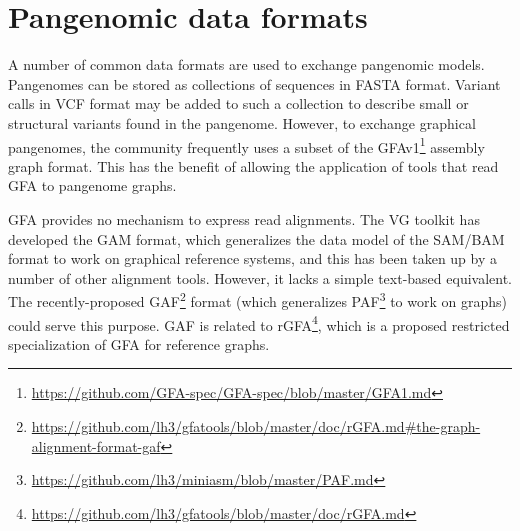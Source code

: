 \section{Pangenomic data formats}
\label{sec:formats}

A number of common data formats are used to exchange pangenomic models.
Pangenomes can be stored as collections of sequences in FASTA format.
Variant calls in VCF format \cite{danecek2011variant} may be added to such a collection to describe small or structural variants found in the pangenome.
However, to exchange graphical pangenomes, the community frequently uses a subset of the GFAv1\footnote{\url{https://github.com/GFA-spec/GFA-spec/blob/master/GFA1.md}} assembly graph format.
This has the benefit of allowing the application of tools that read GFA to pangenome graphs.

GFA provides no mechanism to express read alignments.
The \textsc{VG} toolkit has developed the GAM format, which generalizes the data model of the SAM/BAM \cite{Li_2009} format to work on graphical reference systems, and this has been taken up by a number of other alignment tools.
However, it lacks a simple text-based equivalent.
The recently-proposed GAF\footnote{\url{https://github.com/lh3/gfatools/blob/master/doc/rGFA.md\#the-graph-alignment-format-gaf}} format (which generalizes PAF\footnote{\url{https://github.com/lh3/miniasm/blob/master/PAF.md}} to work on graphs) could serve this purpose.
GAF is related to rGFA\footnote{\url{https://github.com/lh3/gfatools/blob/master/doc/rGFA.md}}, which is a proposed restricted specialization of GFA for reference graphs.
